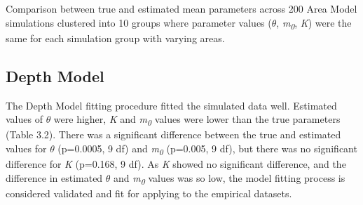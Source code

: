 {\begin{table}[h!]
  \begin{center}
    \caption{Comparison between true and estimated mean parameters across 200 Area Model simulations clustered into 10 groups where parameter values ($\theta$, \textit{m\textsubscript{0}}, \textit{K}) were the same for each simulation group with varying areas.}
    \label{table5}
  \end{center}
\end{table}








\subsection{Depth Model}

\noindent The Depth Model fitting procedure fitted the simulated data well. Estimated values of $\theta$ were higher, \textit{K} and  \textit{m\textsubscript{0}} values were lower than the true parameters (Table 3.2). There was a significant difference between the true and estimated values for $\theta$ (p=0.0005, 9 df) and \textit{m\textsubscript{0}} (p=0.005, 9 df), but there was no significant difference for \textit{K} (p=0.168, 9 df). As \textit{K} showed no significant difference, and the difference in estimated $\theta$ and \textit{m\textsubscript{0}} values was so low, the model fitting process is considered validated and fit for applying to the empirical datasets.  


}
